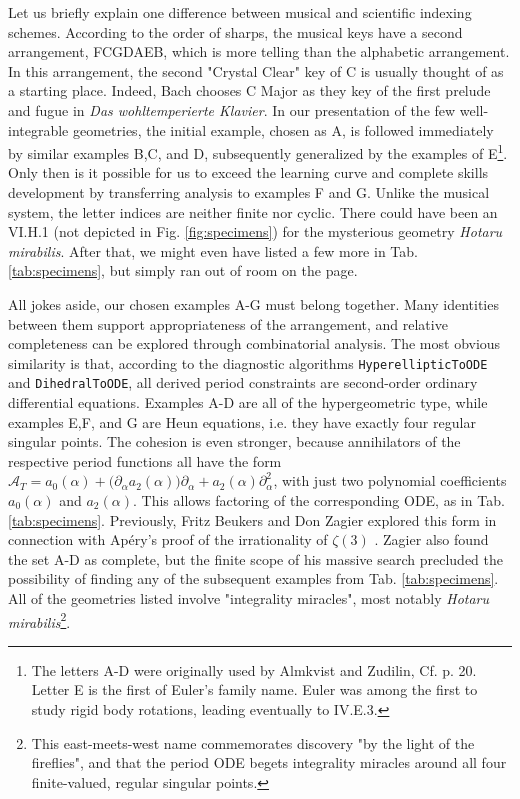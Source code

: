 \documentclass[nofootinbib,preprint]{revtex4-1}
\begin{document}
Let us briefly explain one difference between musical and scientific indexing schemes. 
According to the order of sharps, the musical keys have a second arrangement, FCGDAEB, which 
is more telling than the alphabetic arrangement. In this arrangement, the second "Crystal Clear" 
key of C is usually thought of as a starting place. Indeed, Bach chooses C Major as they key of 
the first prelude and fugue in \textit{Das wohltemperierte Klavier}. In our presentation of the 
few well-integrable geometries, the initial example, chosen as A, is followed immediately 
by similar examples B,C, and D, subsequently generalized by the examples of E\footnote{The 
letters A-D were originally used by Almkvist and Zudilin, Cf. \cite{AZ2004} p. 20.  
Letter E is the first of Euler's family name. Euler was among the first to study rigid body 
rotations, leading eventually to IV.E.3.}. Only then is it possible for us to exceed the 
learning curve and complete skills development by transferring analysis to examples F and G. 
Unlike the musical system, the letter indices are neither finite nor cyclic. There could 
have been an VI.H.1 (not depicted in Fig. \ref{fig:specimens}) for the mysterious 
geometry \textit{Hotaru mirabilis}. After that, we might even have listed a few more in 
Tab. \ref{tab:specimens}, but simply ran out of room on the page.
  
All jokes aside, our chosen examples A-G must belong together. Many identities between them 
support appropriateness of the arrangement, and relative completeness can be explored through 
combinatorial analysis. The most obvious similarity is that, according to the diagnostic
algorithms \texttt{HyperellipticToODE} and \texttt{DihedralToODE},  all derived period
constraints are second-order ordinary differential equations. Examples A-D are all of 
the hypergeometric type, while examples E,F, and G are Heun equations, i.e. they have
exactly four regular singular points. The cohesion is even stronger, because
annihilators of the respective period functions all have the form 
$\mathcal{A}_T=a_0(\alpha)+\big(\partial_{\alpha}a_2(\alpha)\big)\partial_{\alpha}+a_2(\alpha)\partial_{\alpha}^2$,
with just two polynomial coefficients $a_0(\alpha)$ and $a_2(\alpha)$. This allows factoring
of the corresponding ODE, as in Tab. \ref{tab:specimens}. Previously, Fritz Beukers and Don
Zagier explored this form in connection with Ap\'{e}ry's proof of the irrationality of $\zeta(3)$
\cite{ZAGIER2009}. Zagier also found the set A-D as complete, but the finite scope of his massive search precluded 
the possibility of finding any of the subsequent examples from Tab. \ref{tab:specimens}. 
All of the geometries listed involve "integrality miracles", most notably 
\textit{Hotaru mirabilis}\footnote{This east-meets-west name commemorates 
discovery "by the light of the fireflies", and that the period ODE begets integrality 
miracles around all four finite-valued, regular singular points.}.  
\end{document}

